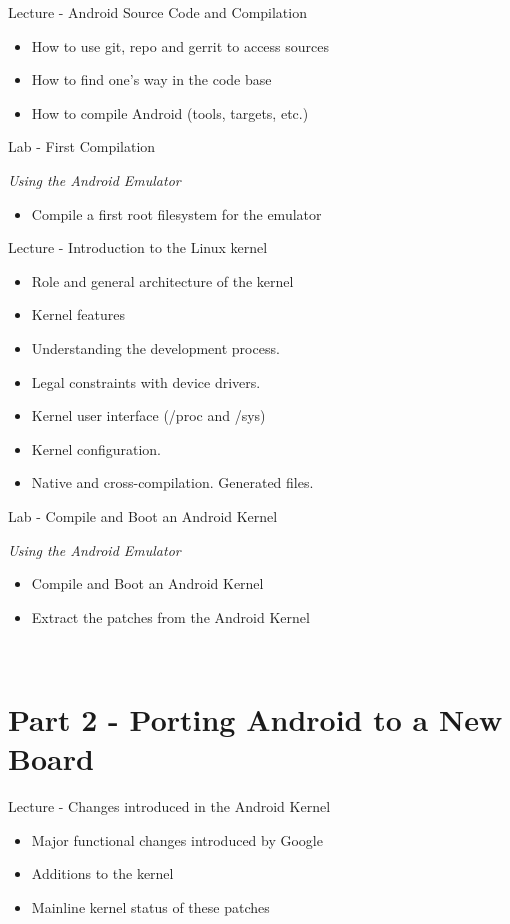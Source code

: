 \documentclass[a4paper,12pt,obeyspaces,spaces,hyphens]{article}
\begin{document}
\feagendatwocolumn
{Lecture - Android Source Code and Compilation}
{
  \begin{itemize}
  \item How to use git, repo and gerrit to access sources
  \item How to find one's way in the code base
  \item How to compile Android (tools, targets, etc.)
  \end{itemize}
}
{Lab - First Compilation}
{
  {\em Using the Android Emulator}
  \begin{itemize}
  \item Compile a first root filesystem for the emulator
  \end{itemize}
}

\feagendatwocolumn
{Lecture - Introduction to the Linux kernel}
{
  \begin{itemize}
  \item Role and general architecture of the kernel
  \item Kernel features
  \item Understanding the development process.
  \item Legal constraints with device drivers.
  \item Kernel user interface (/proc and /sys)
  \item Kernel configuration.
  \item Native and cross-compilation. Generated files.
  \end{itemize}
}
{Lab - Compile and Boot an Android Kernel}
{
  {\em Using the Android Emulator}
  \begin{itemize}
  \item Compile and Boot an Android Kernel
  \item Extract the patches from the Android Kernel
  \end{itemize}
}
\\
\section{Part 2 - Porting Android to a New Board}

\feagendaonecolumn
{Lecture - Changes introduced in the Android Kernel}
{
  \begin{itemize}
  \item Major functional changes introduced by Google
  \item Additions to the kernel
  \item Mainline kernel status of these patches
  \end{itemize}
}
\end{document}
